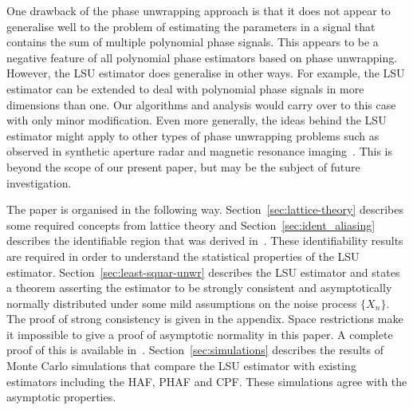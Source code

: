 \documentclass[journal]{IEEEtran}
\begin{document}
One drawback of the phase unwrapping approach is that it does not appear to generalise well to the problem of estimating the parameters in a signal that contains the sum of multiple polynomial phase signals.  This appears to be a negative feature of all polynomial phase estimators based on phase unwrapping.  However, the LSU estimator does generalise in other ways.  For example, the LSU estimator can be extended to deal with polynomial phase signals in more dimensions than one.  Our algorithms and analysis would carry over to this case with only minor modification.  Even more generally, the ideas behind the LSU estimator might apply to other types of phase unwrapping problems such as observed in synthetic aperture radar and magnetic resonance imaging~\cite{Katkovnik_phasela_2009, Nico_phaseunwrappingSAR_2000,Friedlander_PD_phaseunwrapping_1996}. This is beyond the scope of our present paper, but may be the subject of future investigation.

The paper is organised in the following way. Section~\ref{sec:lattice-theory} describes some required concepts from lattice theory and Section~\ref{sec:ident_aliasing} describes the identifiable region that was derived in~\cite{McKilliam2009IndentifiabliltyAliasingPolyphase}.  These identifiability results are required in order to understand the statistical properties of the LSU estimator.  Section~\ref{sec:least-squar-unwr} describes the LSU estimator and states a theorem asserting the estimator to be strongly consistent and asymptotically normally distributed under some mild assumptions on the noise process $\{X_n\}$. The proof of strong consistency is given in the appendix.  Space restrictions make it impossible to give a proof of asymptotic normality in this paper.  A complete proof of this is available in~\cite{McKilliam_arxiv_pps_unwrapping_2012}.  Section~\ref{sec:simulations} describes the results of Monte Carlo simulations that compare the LSU estimator with existing estimators including the HAF, PHAF and CPF.  These simulations agree with the asymptotic properties.


\end{document}
